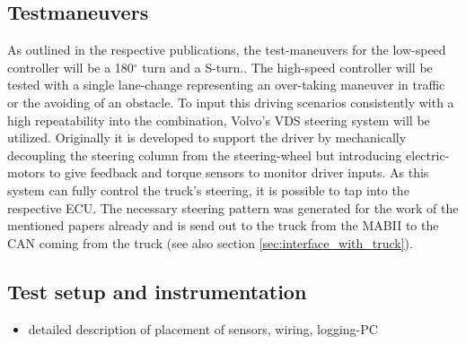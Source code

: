 \documentclass[ExampleMasters.tex]{subfiles}
\begin{document}
\subsection{Testmaneuvers}

As outlined in the respective publications, the test-maneuvers for the low-speed controller will be a 180$^{\circ}$ turn and a S-turn.\cite{Low-speed_paper}. The high-speed controller will be tested with a single lane-change representing an over-taking maneuver in traffic or the avoiding of an obstacle.\cite{High-speed_paper} To input this driving scenarios consistently with a high repeatability into the combination, Volvo's \gls{VDS} steering system will be utilized. Originally it is developed to support the driver by mechanically decoupling the steering column from the steering-wheel but introducing electric-motors to give feedback and torque sensors to monitor driver inputs. As this system can fully control the truck's steering, it is possible to tap into the respective \gls{ECU}. The necessary steering pattern was generated for the work of the mentioned papers already and is send out to the truck from the \gls{MABII} to the \gls{CAN} coming from the truck (see also section \ref{sec:interface_with_truck}).





\subsection{Test setup and instrumentation}

\begin{itemize}
	\item detailed description of placement of sensors, wiring, logging-PC
\end{itemize}
\end{document}

